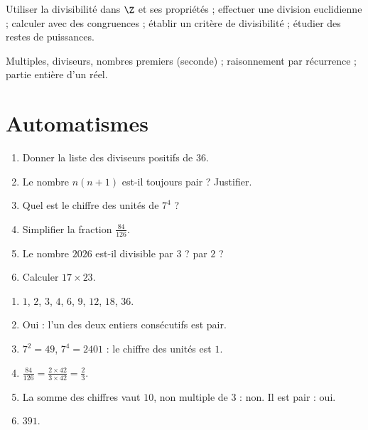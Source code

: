 
\begin{objectives}
Utiliser la divisibilité dans $\Z$ et ses propriétés ; effectuer une division euclidienne ; calculer avec des congruences ; établir un critère de divisibilité ; étudier des restes de puissances.
\end{objectives}
\begin{prerequisites}
Multiples, diviseurs, nombres premiers (seconde) ; raisonnement par récurrence ; partie entière d'un réel.
\end{prerequisites}

\section{Automatismes}
\begin{fluency}
\begin{enumerate}
\item Donner la liste des diviseurs positifs de $36$.
\item Le nombre $n(n+1)$ est-il toujours pair ? Justifier.
\item Quel est le chiffre des unités de $7^4$ ?
\item Simplifier la fraction $\frac{84}{126}$.
\item Le nombre $\num{2026}$ est-il divisible par $3$ ? par $2$ ?
\item Calculer $17\times23$.
\end{enumerate}
\end{fluency}
\begin{solution}[Automatismes]
\begin{enumerate}
\item $1$, $2$, $3$, $4$, $6$, $9$, $12$, $18$, $36$.
\item Oui : l'un des deux entiers consécutifs est pair.
\item $7^2=49$, $7^4=\num{2401}$ : le chiffre des unités est $1$.
\item $\frac{84}{126}=\frac{2\times42}{3\times42}=\frac23$.
\item La somme des chiffres vaut $10$, non multiple de $3$ : non. Il est pair : oui.
\item $391$.
\end{enumerate}
\end{solution}

\mxnewpage
